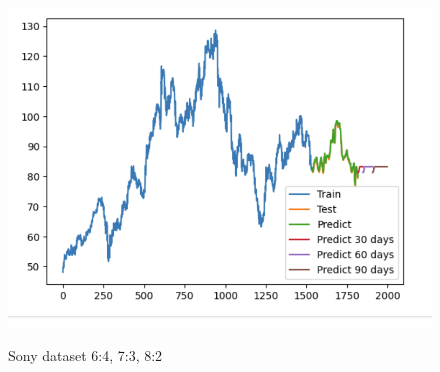 \documentclass[conference]{IEEEtran}
\begin{document}
\begin{figure}[H]
\begin{minipage}{0.15\textwidth}
    \label{fig:2}
    \end{minipage}%
    \begin{minipage}{0.15\textwidth}
    \centering
    \includegraphics[width=1\textwidth]{Image/Light GBM/LightGBM_SONY_8_2.png}

    \label{fig:3}
    \end{minipage}
    \caption{Sony dataset  6:4, 7:3, 8:2 }
\end{figure}
\end{document}
